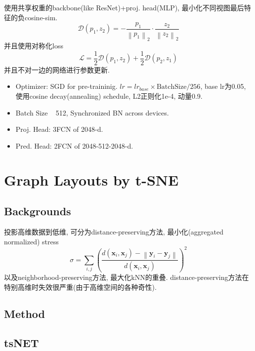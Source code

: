 \documentclass{article}
\begin{document}
使用共享权重的backbone(like ResNet)+proj. head(MLP), 最小化不同视图最后特征的负cosine-sim.
\begin{equation}
    \mathcal{D}\left(p_{1}, z_{2}\right)=-\frac{p_{1}}{\left\|p_{1}\right\|_{2}} \cdot \frac{z_{2}}{\left\|z_{2}\right\|_{2}}
\end{equation}
并且使用对称化loss
\begin{equation}
    \mathcal{L}=\frac{1}{2} \mathcal{D}\left(p_{1}, z_{2}\right)+\frac{1}{2} \mathcal{D}\left(p_{2}, z_{1}\right)
\end{equation}
并且不对一边的网络进行参数更新.

 \begin{itemize}
    \item Optimizer: SGD for pre-traininig. $lr=lr_{base}\times \text{BatchSize}/256$, base lr为0.05, 使用cosine decay(annealing) schedule, L2正则化1e-4, 动量0.9.
    \item Batch Size ~ 512, Synchronized BN across devices.
    \item Proj. Head: 3FCN of 2048-d.
    \item Pred. Head: 2FCN of 2048-512-2048-d.
\end{itemize}

\section{Graph Layouts by t-SNE}

\subsection{Backgrounds}


投影高维数据到低维, 可分为distance-preserving方法, 最小化(aggregated normalized) stress
\begin{equation}
    \sigma=\sum_{i, j}\left(\frac{d\left(\mathbf{x}_{i}, \mathbf{x}_{j}\right)-\left\|\mathbf{y}_{i}-\mathbf{y}_{j}\right\|}{d\left(\mathbf{x}_{i}, \mathbf{x}_{j}\right)}\right)^{2}
\end{equation}
以及neighborhood-preserving方法, 最大化kNN的重叠. distance-preserving方法在特别高维时失效很严重(由于高维空间的各种奇性).

\subsection{Method}
\subsection{tsNET}
\end{document}
